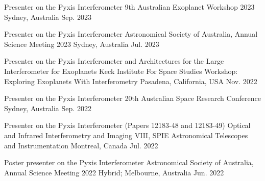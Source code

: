 

\begin{cventries}

    \cventry
    {Presenter on the Pyxis Interferometer} %
    {9th Australian Exoplanet Workshop 2023} %
    {Sydney, Australia} %
    {Sep. 2023} %
    {}
      \vspace{-0.2cm}  
    
    \cventry
    {Presenter on the Pyxis Interferometer} %
    {Astronomical Society of Australia, Annual Science Meeting 2023} %
    {Sydney, Australia} %
    {Jul. 2023} %
    {}
      \vspace{-0.2cm}  
      
       
       \cventry
    {Presenter on the Pyxis Interferometer and Architectures for the Large Interferometer for Exoplanets} %
    {Keck Institute For Space Studies Workshop: Exploring Exoplanets With Interferometry} %
    {Pasadena, California, USA} %
    {Nov. 2022} %
    {}
    \vspace{-0.2cm}
      
      \cventry
    {Presenter on the Pyxis Interferometer} %
    {20th Australian Space Research Conference} %
    {Sydney, Australia} %
    {Sep. 2022} %
    {}
    \vspace{-0.2cm}
    
       \cventry
    {Presenter on the Pyxis Interferometer (Papers 12183-48 and 12183-49)} %
    {Optical and Infrared Interferometry and Imaging VIII, SPIE Astronomical Telescopes and Instrumentation} %
    {Montreal, Canada} %
    {Jul. 2022} %
    {}
    \vspace{-0.2cm}
    
    \cventry
    {Poster presenter on the Pyxis Interferometer} %
    {Astronomical Society of Australia, Annual Science Meeting 2022} %
    {Hybrid; Melbourne, Australia} %
    {Jun. 2022} %
    {}
    \vspace{-0.2cm}    
    

\end{cventries}
